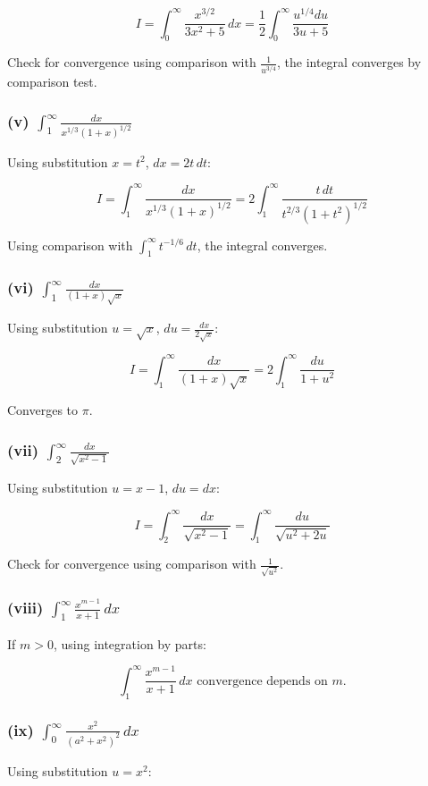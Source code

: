 \documentclass{article}
\begin{document}
\[
I = \int_0^\infty \frac{x^{3/2}}{3x^2 + 5} \, dx = \frac{1}{2} \int_0^\infty \frac{u^{1/4} du}{3u + 5}
\]


Check for convergence using comparison with \(\frac{1}{u^{3/4}}\), the integral converges by comparison test.

\subsubsection*{(v) \(\int_1^\infty \frac{dx}{x^{1/3}(1 + x)^{1/2}}\)}
Using substitution \( x = t^2 \), \( dx = 2t \, dt \):


\[
I = \int_1^\infty \frac{dx}{x^{1/3}(1 + x)^{1/2}} = 2 \int_1^\infty \frac{t \, dt}{t^{2/3}(1 + t^2)^{1/2}}
\]


Using comparison with \( \int_1^\infty t^{-1/6} \, dt\), the integral converges.

\subsubsection*{(vi) \(\int_1^\infty \frac{dx}{(1 + x)\sqrt{x}}\)}
Using substitution \( u = \sqrt{x} \), \( du = \frac{dx}{2\sqrt{x}} \):


\[
I = \int_1^\infty \frac{dx}{(1 + x)\sqrt{x}} = 2 \int_1^\infty \frac{du}{1 + u^2}
\]


Converges to \( \pi \).

\subsubsection*{(vii) \(\int_2^\infty \frac{dx}{\sqrt{x^2 - 1}}\)}
Using substitution \( u = x - 1 \), \( du = dx \):


\[
I = \int_2^\infty \frac{dx}{\sqrt{x^2 - 1}} = \int_1^\infty \frac{du}{\sqrt{u^2 + 2u}}
\]


Check for convergence using comparison with \(\frac{1}{\sqrt{u^2}}\).

\subsubsection*{(viii) \(\int_1^\infty \frac{x^{m-1}}{x + 1} \, dx\)}
If \( m > 0 \), using integration by parts:


\[
\int_1^\infty \frac{x^{m-1}}{x + 1} \, dx \text{ convergence depends on } m.
\]



\subsubsection*{(ix) \(\int_0^\infty \frac{x^2}{(a^2 + x^2)^2} \, dx\)}
Using substitution \( u = x^2 \):
\end{document}
